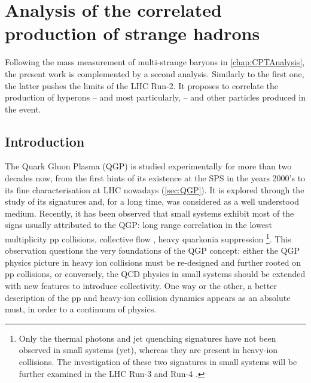 \chapter{Analysis of the correlated production of strange hadrons}
\label{chap:CorrelatedAnalysis}

Following the mass measurement of multi-strange baryons in  \chap\ref{chap:CPTAnalysis}, the present work is complemented by a second analysis. Similarly to the first one, the latter pushes the limits of the LHC Run-2. It proposes to correlate the production of hyperons -- and most particularly, \rmOmega -- and other particles produced in the event. 

\section{Introduction}

The Quark Gluon Plasma (QGP) is studied experimentally for more than two decades now, from the first hints of its existence at the SPS in the years 2000's to its fine characterisation at LHC nowadays (\Sec\ref{sec:QGP}). It is explored through the study of its signatures and, for a long time, was considered as a well understood medium. Recently, it has been observed that small systems exhibit most of the signs usually attributed to the QGP: long range correlation in the lowest multiplicity pp collisions\cite{alicecollaborationALICESeesRidge}, collective flow \cite{cmscollaborationEvidenceCollectiveMultiparticle2015}\cite{alicecollaborationAnisotropicFlowFlow2022}, heavy quarkonia suppression \cite{singhCharmoniumSuppressionUltrarelativistic2022}\footnote{Only the thermal photons and jet quenching signatures have not been observed in small systems (yet), whereas they are present in heavy-ion collisions. The investigation of these two signatures in small systems will be further examined in the LHC Run-3 and Run-4 \cite{vanleeuwenHighlightsALICE59th}.}. This observation questions the very foundations of the QGP concept: either the QGP physics picture in heavy ion collisions must be re-designed and further rooted on pp collisions, or conversely, the QCD physics in small systems should be extended with new features to introduce collectivity. One way or the other, a better description of the pp and heavy-ion collision dynamics appears as an absolute must, in order to a continuum of physics.

